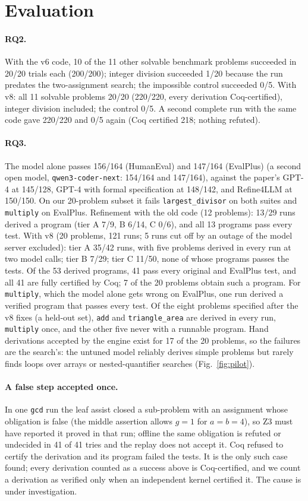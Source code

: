 \documentclass[10pt]{article}
\newcommand{\code}[1]{\texttt{#1}}
\begin{document}
\section{Evaluation}
\paragraph{RQ2.} With the v6 code, 10 of the 11 other solvable benchmark problems succeeded in 20/20 trials each (200/200); integer division succeeded 1/20 because the run predates the two-assignment search; the impossible control succeeded 0/5. With v8: all 11 solvable problems 20/20 (220/220, every derivation Coq-certified), integer division included; the control 0/5. A second complete run with the same code gave 220/220 and 0/5 again (Coq certified 218; nothing refuted).

\paragraph{RQ3.} The model alone passes 156/164 (HumanEval) and 147/164 (EvalPlus) (a second open model, \code{qwen3-coder-next}: 154/164 and 147/164), against the paper's GPT-4 at 145/128, GPT-4 with formal specification at 148/142, and Refine4LLM at 150/150. On our 20-problem subset it fails \code{largest\_divisor} on both suites and \code{multiply} on EvalPlus. Refinement with the old code (12 problems): 13/29 runs derived a program (tier A 7/9, B 6/14, C 0/6), and all 13 programs pass every test. With v8 (20 problems, 121 runs; 5 runs cut off by an outage of the model server excluded): tier A 35/42 runs, with five problems derived in every run at two model calls; tier B 7/29; tier C 11/50, none of whose programs passes the tests. Of the 53 derived programs, 41 pass every original and EvalPlus test, and all 41 are fully certified by Coq; 7 of the 20 problems obtain such a program. For \code{multiply}, which the model alone gets wrong on EvalPlus, one run derived a verified program that passes every test. Of the eight problems specified after the v8 fixes (a held-out set), \code{add} and \code{triangle\_area} are derived in every run, \code{multiply} once, and the other five never with a runnable program. Hand derivations accepted by the engine exist for 17 of the 20 problems, so the failures are the search's: the untuned model reliably derives simple problems but rarely finds loops over arrays or nested-quantifier searches (Fig.~\ref{fig:pilot}).

\paragraph{A false step accepted once.} In one \code{gcd} run the leaf assist closed a sub-problem with an assignment whose obligation is false (the middle assertion allows $g=1$ for $a=b=4$), so Z3 must have reported it proved in that run; offline the same obligation is refuted or undecided in 41 of 41 tries and the replay does not accept it. Coq refused to certify the derivation and its program failed the tests. It is the only such case found; every derivation counted as a success above is Coq-certified, and we count a derivation as verified only when an independent kernel certified it. The cause is under investigation.
\end{document}
